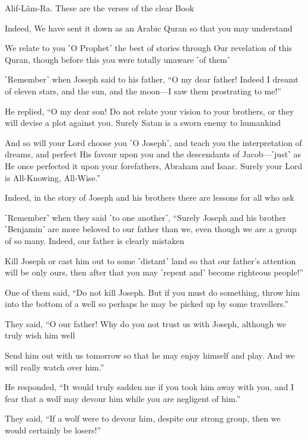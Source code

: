 Alif-Lãm-Ra. These are the verses of the clear Book

Indeed, We have sent it down as an Arabic Quran so that you may understand

We relate to you ˹O Prophet˺ the best of stories through Our revelation of this Quran, though before this you were totally unaware ˹of them˺

˹Remember˺ when Joseph said to his father, “O my dear father! Indeed I dreamt of eleven stars, and the sun, and the moon—I saw them prostrating to me!”

He replied, “O my dear son! Do not relate your vision to your brothers, or they will devise a plot against you. Surely Satan is a sworn enemy to humankind

And so will your Lord choose you ˹O Joseph˺, and teach you the interpretation of dreams, and perfect His favour upon you and the descendants of Jacob—˹just˺ as He once perfected it upon your forefathers, Abraham and Isaac. Surely your Lord is All-Knowing, All-Wise.”

Indeed, in the story of Joseph and his brothers there are lessons for all who ask

˹Remember˺ when they said ˹to one another˺, “Surely Joseph and his brother ˹Benjamin˺ are more beloved to our father than we, even though we are a group of so many. Indeed, our father is clearly mistaken

Kill Joseph or cast him out to some ˹distant˺ land so that our father’s attention will be only ours, then after that you may ˹repent and˺ become righteous people!”

One of them said, “Do not kill Joseph. But if you must do something, throw him into the bottom of a well so perhaps he may be picked up by some travellers.”

They said, “O our father! Why do you not trust us with Joseph, although we truly wish him well

Send him out with us tomorrow so that he may enjoy himself and play. And we will really watch over him.”

He responded, “It would truly sadden me if you took him away with you, and I fear that a wolf may devour him while you are negligent of him.”

They said, “If a wolf were to devour him, despite our strong group, then we would certainly be losers!”

